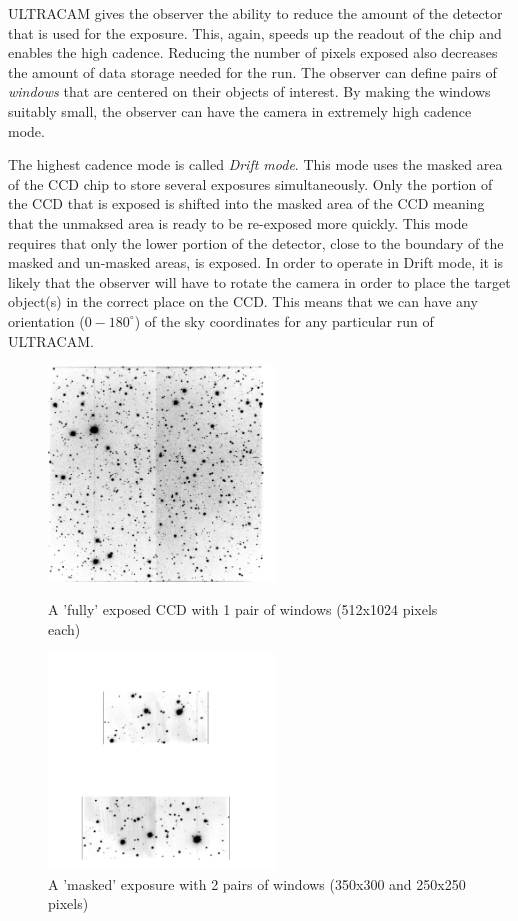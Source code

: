 \documentclass[a4paper,10pt]{article}
\begin{document}
ULTRACAM gives the observer the ability to reduce the amount of the detector that is used for the exposure. This, again, speeds up the readout of the chip and enables the high cadence. Reducing the number of pixels exposed also decreases the amount of data storage needed for the run. The observer can define pairs of \emph{windows} that are centered on their objects of interest. By making the windows suitably small, the observer can have the camera in extremely high cadence mode. 

The highest cadence mode is called \emph{Drift mode}. This mode uses the masked area of the CCD chip to store several exposures simultaneously. Only the portion of the CCD that is exposed is shifted into the masked area of the CCD meaning that the unmaksed area is ready to be re-exposed more quickly. This mode requires that only the lower portion of the detector, close to the boundary of the masked and un-masked areas, is exposed. In order to operate in Drift mode, it is likely that the observer will have to rotate the camera in order to place the target object(s) in the correct place on the CCD. This means that we can have any orientation ($0-180^{\circ}$) of the sky coordinates for any particular run of ULTRACAM.   

\begin{figure}
\centering
\begin{minipage}{.5\textwidth}
  \centering
  \includegraphics[width=60mm]{images/run010_r_inverted.png}
  \caption{A 'fully' exposed CCD with 1 pair of windows (512x1024 pixels each)}
  \label{fig:KOI-824}
\end{minipage}%
\begin{minipage}{.5\textwidth}
  \centering
  \includegraphics[width=60mm]{images/run016_r_inverted.png}
  \caption{A 'masked' exposure with 2 pairs of windows (350x300 and 250x250 pixels)}
  \label{fig:V713Cep}
\end{minipage}
\end{figure}
\end{document}

